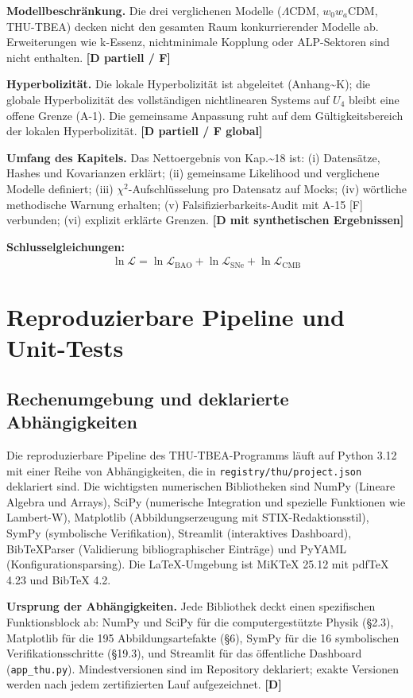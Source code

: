 ﻿\documentclass[11pt,letterpaper]{article}
\begin{document}
\textbf{Modellbeschränkung.} Die drei verglichenen Modelle ($\Lambda$CDM, $w_0w_a$CDM, THU-TBEA) decken nicht den gesamten Raum konkurrierender Modelle ab. Erweiterungen wie k-Essenz, nichtminimale Kopplung oder ALP-Sektoren sind nicht enthalten. \textbf{[D partiell / F]}

\textbf{Hyperbolizität.} Die lokale Hyperbolizität ist abgeleitet (Anhang\textasciitilde{}K); die globale Hyperbolizität des vollständigen nichtlinearen Systems auf $U_4$ bleibt eine offene Grenze (A-1). Die gemeinsame Anpassung ruht auf dem Gültigkeitsbereich der lokalen Hyperbolizität. \textbf{[D partiell / F global]}

\textbf{Umfang des Kapitels.} Das Nettoergebnis von Kap.\textasciitilde{}18 ist: (i) Datensätze, Hashes und Kovarianzen erklärt; (ii) gemeinsame Likelihood und verglichene Modelle definiert; (iii) $\chi^2$-Aufschlüsselung pro Datensatz auf Mocks; (iv) wörtliche methodische Warnung erhalten; (v) Falsifizierbarkeits-Audit mit A-15 [F] verbunden; (vi) explizit erklärte Grenzen. \textbf{[D mit synthetischen Ergebnissen]}

\textbf{Schlusselgleichungen:}
\begin{align*}
    \ln\mathcal{L} = \ln\mathcal{L}_{\mathrm{BAO}} + \ln\mathcal{L}_{\mathrm{SNe}} + \ln\mathcal{L}_{\mathrm{CMB}}
\end{align*}
\section{Reproduzierbare Pipeline und Unit-Tests}
\subsection{Rechenumgebung und deklarierte Abhängigkeiten}
Die reproduzierbare Pipeline des THU-TBEA-Programms läuft auf Python 3.12 mit einer Reihe von Abhängigkeiten, die in \texttt{registry/thu/project.json} deklariert sind. Die wichtigsten numerischen Bibliotheken sind NumPy (Lineare Algebra und Arrays), SciPy (numerische Integration und spezielle Funktionen wie Lambert-W), Matplotlib (Abbildungserzeugung mit STIX-Redaktionsstil), SymPy (symbolische Verifikation), Streamlit (interaktives Dashboard), BibTeXParser (Validierung bibliographischer Einträge) und PyYAML (Konfigurationsparsing). Die LaTeX-Umgebung ist MiKTeX 25.12 mit pdfTeX 4.23 und BibTeX 4.2.

\textbf{Ursprung der Abhängigkeiten.} Jede Bibliothek deckt einen spezifischen Funktionsblock ab: NumPy und SciPy für die computergestützte Physik (§2.3), Matplotlib für die 195 Abbildungsartefakte (§6), SymPy für die 16 symbolischen Verifikationsschritte (§19.3), und Streamlit für das öffentliche Dashboard (\texttt{app\_thu.py}). Mindestversionen sind im Repository deklariert; exakte Versionen werden nach jedem zertifizierten Lauf aufgezeichnet. \textbf{[D]}
\end{document}
